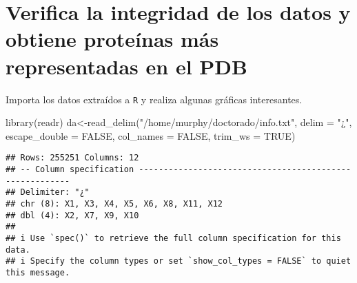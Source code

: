 \documentclass[
]{book}
\newenvironment{Shaded}{\begin{snugshade}}{\end{snugshade}}
\newcommand{\AttributeTok}[1]{\textcolor[rgb]{0.77,0.63,0.00}{#1}}
\newcommand{\ConstantTok}[1]{\textcolor[rgb]{0.00,0.00,0.00}{#1}}
\newcommand{\FunctionTok}[1]{\textcolor[rgb]{0.00,0.00,0.00}{#1}}
\newcommand{\NormalTok}[1]{#1}
\newcommand{\OtherTok}[1]{\textcolor[rgb]{0.56,0.35,0.01}{#1}}
\newcommand{\StringTok}[1]{\textcolor[rgb]{0.31,0.60,0.02}{#1}}
\theoremstyle{definition}
\theoremstyle{definition}
\theoremstyle{definition}
\theoremstyle{definition}
\theoremstyle{remark}
\begin{document}
\hypertarget{verifica-la-integridad-de-los-datos-y-obtiene-proteuxednas-muxe1s-representadas-en-el-pdb}{%
\section{Verifica la integridad de los datos y obtiene proteínas más representadas en el PDB}\label{verifica-la-integridad-de-los-datos-y-obtiene-proteuxednas-muxe1s-representadas-en-el-pdb}}

Importa los datos extraídos a \texttt{R} y realiza algunas gráficas interesantes.

\begin{Shaded}
\begin{Highlighting}[]
\FunctionTok{library}\NormalTok{(readr)}
\NormalTok{da}\OtherTok{\textless{}{-}}\FunctionTok{read\_delim}\NormalTok{(}\StringTok{"/home/murphy/doctorado/info.txt"}\NormalTok{, }\AttributeTok{delim =} \StringTok{"¿"}\NormalTok{, }\AttributeTok{escape\_double =} \ConstantTok{FALSE}\NormalTok{, }\AttributeTok{col\_names =} \ConstantTok{FALSE}\NormalTok{, }\AttributeTok{trim\_ws =} \ConstantTok{TRUE}\NormalTok{)}
\end{Highlighting}
\end{Shaded}

\begin{verbatim}
## Rows: 255251 Columns: 12
## -- Column specification --------------------------------------------------------
## Delimiter: "¿"
## chr (8): X1, X3, X4, X5, X6, X8, X11, X12
## dbl (4): X2, X7, X9, X10
## 
## i Use `spec()` to retrieve the full column specification for this data.
## i Specify the column types or set `show_col_types = FALSE` to quiet this message.
\end{verbatim}
\end{document}
